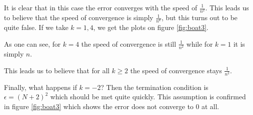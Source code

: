 It is clear that in this case the error converges with the speed of \(\frac{1}{n^2}\). This leads us to believe that the speed of convergence is simply \(\frac{1}{n^k}\), but this turns out to be quite false. If we take \(k = 1, 4\), we get the plots on figure \ref{fig:boat3}.

As one can see, for \(k = 4\) the speed of convergence is still \(\frac{1}{n^2}\) while for \(k = 1\) it is simply \(n\).

This leads us to believe that for all \(k \geq 2\) the speed of convergence stays \(\frac{1}{n^2}\).

Finally, what happens if \(k = -2\)? Then the termination condition is \(\epsilon = (N + 2)^2\) which should be met quite quickly. This assumption is confirmed in figure \ref{fig:boat3} which shows the error does not converge to \(0\) at all.